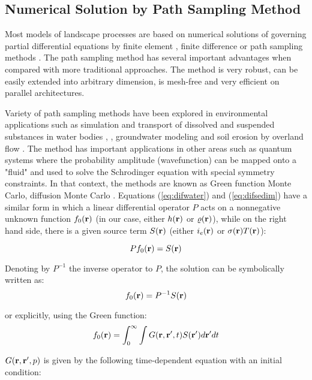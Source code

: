 \documentclass[fleqn,12pt,twoside]{article}
\begin{document}
\subsection{Numerical Solution by Path Sampling Method}

Most models of landscape processes are based on numerical solutions 
of governing partial differential equations by finite element \cite{vieux96},
finite difference \cite{saghafian96} or path sampling methods \cite{mitwrr98}. 
The path sampling method has several important advantages when compared 
with more traditional approaches. The method is very robust, can be easily 
extended into arbitrary dimension, is mesh-free and very efficient 
on parallel architectures.

Variety of path sampling methods have been explored in environmental 
applications such as simulation and transport of dissolved 
and suspended substances in water bodies \cite{mike21pa}, \cite{dimou93}, 
groundwater modeling \cite{thompson90}  and soil erosion by 
overland flow \cite{mitwrr98}. The method has important applications 
in other areas such as quantum systems where the probability 
amplitude (wavefunction) can be mapped onto a "fluid" and used 
to solve the Schrodinger equation with special symmetry
constraints. In that context, the methods are known as 
Green function Monte Carlo, diffusion Monte Carlo \cite{foulkes01}.
Equations (\ref{eq:difwater}) and (\ref{eq:difsedim}) have a similar 
form in which a linear differential operator $P$ acts on a nonnegative
unknown function $f_0({\bf r})$ (in our case, either $h({\bf r})$ or $\varrho ({\bf r})$),
  while on the right hand side, there is a
given source term $S({\bf r})$ (either $i_e({\bf r})$ or
$\sigma({\bf r})T({\bf r})$):

\begin{equation}
{P} f_0({\bf r})= S({\bf r})
\end{equation}

\noindent
Denoting by ${P}^{-1}$ the inverse operator to $P$,
 the solution can be symbolically written as:
\begin{equation}
f_0({\bf r})=  P^{-1} S({\bf r})
\end{equation}

\noindent
or explicitly, using the Green function:
\begin{equation}
f_0({\bf r})= \int_0^{\infty}\int G({\bf r},{\bf r'},t)
 {S}({\bf r'}) d{\bf r'}dt
\end{equation}

\noindent
$G({\bf r},{\bf r'},p)$
is given by the following time-dependent equation 
with an initial condition:
\end{document}

